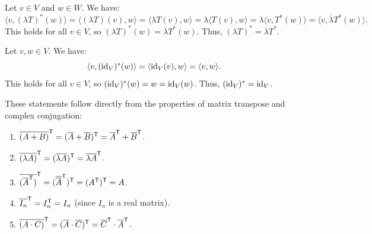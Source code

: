 \begin{exercisesolution}
\label{sol:properties_adjoint_map_c}
Let $v \in V$ and $w \in W$. We have:
\[
    \langle v, (\lambda T)^*(w) \rangle = \langle (\lambda T)(v), w \rangle = \langle \lambda T(v), w \rangle = \lambda \langle T(v), w \rangle = \lambda \langle v, T^*(w) \rangle = \langle v, \overline{\lambda} T^*(w) \rangle.
\]
This holds for all $v \in V$, so $(\lambda T)^*(w) = \overline{\lambda} T^*(w)$. Thus, $(\lambda T)^* = \overline{\lambda} T^*$.
\end{exercisesolution}

\begin{exercisesolution}
\label{sol:properties_adjoint_map_e}
Let $v, w \in V$. We have:
\[
    \langle v, (\operatorname{id}_V)^*(w) \rangle = \langle \operatorname{id}_V(v), w \rangle = \langle v, w \rangle.
\]
This holds for all $v \in V$, so $(\operatorname{id}_V)^*(w) = w = \operatorname{id}_V(w)$. Thus, $(\operatorname{id}_V)^* = \operatorname{id}_V$.
\end{exercisesolution}

\begin{exercisesolution}
\label{sol:properties_adjoint_matrix}
These statements follow directly from the properties of matrix transpose and complex conjugation:
\begin{enumerate}[label=\textbf{(\alph*)}]
    \item $\overline{(A+B)}^{\mathsf{T}} = (\overline{A} + \overline{B})^{\mathsf{T}} = \overline{A}^{\mathsf{T}} + \overline{B}^{\mathsf{T}}$.
    \item $\overline{(\lambda A)}^{\mathsf{T}} = (\overline{\lambda} \overline{A})^{\mathsf{T}} = \overline{\lambda} \overline{A}^{\mathsf{T}}$.
    \item $\overline{(\overline{A}^{\mathsf{T}})}^{\mathsf{T}} = (\overline{\overline{A}}^{\mathsf{T}})^{\mathsf{T}} = (A^{\mathsf{T}})^{\mathsf{T}} = A$.
    \item $\overline{I_n}^{\mathsf{T}} = I_n^{\mathsf{T}} = I_n$ (since $I_n$ is a real matrix).
    \item $\overline{(A \cdot C)}^{\mathsf{T}} = (\overline{A} \cdot \overline{C})^{\mathsf{T}} = \overline{C}^{\mathsf{T}} \cdot \overline{A}^{\mathsf{T}}$.
\end{enumerate}
\end{exercisesolution}

